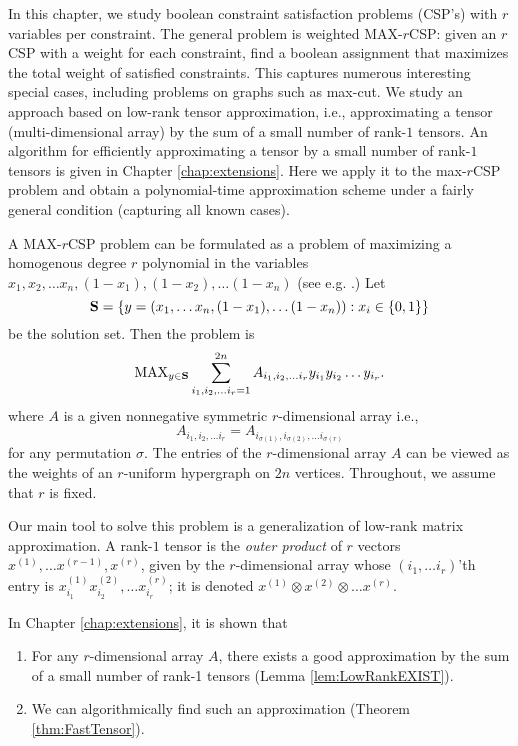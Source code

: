 \documentclass{book}
\numberwithin{exercise}{chapter}
\begin{document}
In this chapter, we study boolean constraint satisfaction problems
(CSP's) with $r$ variables per constraint. The general problem is weighted MAX-$r$CSP: given an $r$CSP with a weight for each constraint, find a boolean assignment that maximizes the total weight of satisfied constraints. This captures numerous interesting special cases, including problems on graphs such as max-cut. We study an approach based on low-rank tensor approximation, i.e., approximating a tensor (multi-dimensional array) by the sum of a small number of rank-$1$ tensors. An algorithm for efficiently approximating a tensor by a small number of rank-$1$ tensors is given in Chapter \ref{chap:extensions}. Here we apply it to the max-$r$CSP problem and obtain a polynomial-time approximation scheme under a fairly general condition (capturing all known cases).

A MAX-$r$CSP problem can be formulated as a problem of maximizing
a homogenous degree $r$ polynomial in the variables $x_1,x_2,
\ldots x_n, (1-x_1),(1-x_2),\ldots (1-x_n)$
(see e.g. \cite{AFKK02}.) Let
$${\bf S}=\{ y=(x_1,\ldots x_n, (1-x_1),\ldots (1-x_n)):
x_i\in \{ 0,1\} \}$$
be the solution set.
Then the problem is
$$\hbox{MAX}_{y\in {\bf S}}
\sum_{i_1,i_2,\ldots i_r=1}^{2n} A_{i_1,i_2,\ldots i_r} y_{i_1}y_{i_2}
\ldots y_{i_r}.$$
where $A$ is a given nonnegative symmetric $r$-dimensional array
i.e.,
\[A_{i_1,i_2,\ldots i_r}= A_{i_{\sigma(1)},i_{\sigma(2)},\ldots i_{\sigma (r)} }
\]
for any permutation $\sigma$.
The entries of the $r$-dimensional array $A$ can be viewed as the
weights of an $r$-uniform hypergraph on $2n$ vertices. Throughout,
we assume that $r$ is fixed.

Our main tool to solve this problem is a generalization of low-rank
matrix approximation. A rank-$1$ tensor is the {\em outer product} of $r$ vectors
 $x^{(1)},\ldots x^{(r-1)},x^{(r)}$, given by the
$r$-dimensional array whose $(i_1,\ldots i_r)$'th
entry is $x^{(1)}_{i_1}x^{(2)}_{i_2},
\ldots x^{(r)}_{i_{r} }$; it is denoted
$x^{(1)}\otimes x^{(2)}\otimes \ldots x^{(r)}$.

In Chapter \ref{chap:extensions}, it is shown that
\begin{enumerate}
\item For any $r$-dimensional array $A$, there exists
a good approximation by the
sum of a small number of rank-1 tensors (Lemma \ref{lem:LowRankEXIST}).

\item We can algorithmically find such an approximation (Theorem \ref{thm:FastTensor}).
\end{enumerate}
\end{document}
